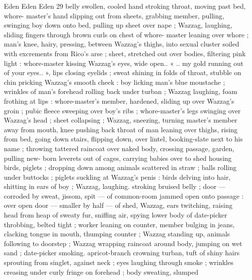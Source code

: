 Eden Eden Eden 29
belly swollen, cooled hand stroking throat, moving past bed, whore-
master’s hand slipping out from sheets, grabbing member, pulling,
swinging boy down onto bed, pulling up sheet over nape ; Wazzag,
laughing, sliding fingers through brown curls on chest of whore-
master leaning over whore ; man's knee, hairy, pressing, between
Wazzag's thighs, into sexual cluster soiled with excrements from
Rico's arse ; sheet, stretched out over bodies, filtering pink light :
whore-master kissing Wazzag's eyes, wide open.. « .. my gold
running out of your eyes.. », lips closing eyelids ; sweat shining in
folds of throat, stubble on chin pricking Wazzag's smooth cheek :
boy licking man's blue moustache ; wrinkles of man's forehead
rolling back under turban ; Wazzag laughing, foam frothing at lips :
whore-master's member, hardened, sliding up over Wazzag’s groin ;
pubic fleece sweeping over boy's ribs ; whore-master's legs swinging
over Wazzag's head ; sheet collapsing ; Wazzag, sneezing, turning
master's member away from mouth, knee pushing back throat of man
leaning over thighs, rising from bed, going down stairs, flipping
down, over lintel, booking-slate next to his name ; throwing tattered
raincoat over naked body, crossing passage, garden, pulling new-
born leverets out of cages, carrying babies over to shed housing
birds, piglets ; dropping down among animals scattered in straw ;
balls rolling under buttocks ; piglets suckling at Wazzag's penis :
birds delving into hair, shitting in ears of boy ; Wazzag, laughing.
stroking bruised belly ; door — corroded by sweat, jissom, spit —
of common-room jammed open onto passage : over open door —
smaller by half — of shed, Wazzag, ears twitching, raising head from
heap of sweaty fur, sniffing air, spying lower body of date-picker
throbbing, belted tight ; worker leaning on counter, member bulging
in jeans, clacking tongue in mouth, thumping counter ; Wazzag
standing up, animals following to doorstep ; Wazzag wrapping
raincoat around body, jumping on wet sand ; date-picker smoking.
apricot-branch crowning turban, tuft of shiny hairs sprouting from
singlet, against neck ; eyes laughing through smoke ; wrinkles
creasing under curly fringe on forehead ; body sweating, slumped

